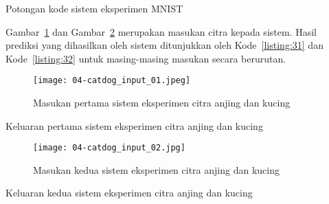 \begin{code}
	\caption{Potongan kode sistem eksperimen MNIST}\label{listing:30}
\end{code}

Gambar~\ref{fig:04-catdog-input-01} dan Gambar~\ref{fig:04-catdog-input-02} merupakan masukan citra kepada sistem.
Hasil prediksi yang dihasilkan oleh sistem ditunjukkan oleh Kode~\ref{listing:31} dan Kode~\ref{listing:32} untuk masing-masing masukan secara berurutan.

\begin{figure}[H]
    \centering
    \texttt{[image: 04-catdog\_input\_01.jpeg]}
	\caption{Masukan pertama sistem eksperimen citra anjing dan kucing}\label{fig:04-catdog-input-01}
\end{figure}

\begin{code}
	\caption{Keluaran pertama sistem eksperimen citra anjing dan kucing}\label{listing:31}
\end{code}

\begin{figure}[H]
    \centering
	\texttt{[image: 04-catdog\_input\_02.jpg]}
	\caption{Masukan kedua sistem eksperimen citra anjing dan kucing}\label{fig:04-catdog-input-02}
\end{figure}

\begin{code}
	\caption{Keluaran kedua sistem eksperimen citra anjing dan kucing}\label{listing:32}
\end{code}